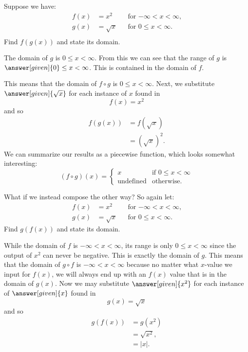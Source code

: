 \documentclass{ximera}
\begin{document}
\begin{example}
 Suppose we have:
\begin{align*}
  f(x)&=x^2 &&\text{for $-\infty< x< \infty$,}\\
  g(x)&= \sqrt{x} &&\text{for $0\le x< \infty$.}\\
\end{align*}
Find $f(g(x))$ and state its domain.
\begin{explanation}
  The domain of $g$ is $0\le x< \infty$. From this we can see that the
  range of $g$ is $\answer[given]{0}\le x< \infty$. This is contained
  in the domain of $f$.

  This means that the domain of $f\circ g$ is $0\le x< \infty$.  Next,
  we substitute $\answer[given]{\sqrt{x}}$ for each instance of $x$
  found in
  \[
  f(x)={{x}^{2}}
  \]
  and so
  \begin{align*}
  f(g(x))&=f(\sqrt{x})\\
  &=\left(\sqrt{x}\right)^2.
  \end{align*}
  We can summarize our results as a piecewise function, which
  looks somewhat interesting:
  \[
  (f\circ g)(x) = 
  \begin{cases}
    x & \text{if $0\le x < \infty$}\\
   \text{undefined} &\text{otherwise}. 
  \end{cases}
  \]
\end{explanation}
\end{example}


\begin{example}
 What if we instead compose the other way? So again let:
\begin{align*}
  f(x)&=x^2 &&\text{for $-\infty< x< \infty$,}\\
  g(x)&= \sqrt{x} &&\text{for $0\le x< \infty$.}
\end{align*}
Find $g(f(x))$ and state its domain.
\begin{explanation}
  While the domain of $f$ is $-\infty< x< \infty$, its range is only
  $0 \le x<\infty$ since the output of $x^2$ can never be negative. This is exactly the domain of $g$. This means that
  the domain of $g\circ f$ is $-\infty< x< \infty$ because no matter what $x$-value we input for $f(x)$, we will always end up with an $f(x)$ value that is in the domain of $g(x)$.
  Now we may substitute $\answer[given]{x^2}$ for each instance of
  $\answer[given]{x}$ found in
  \[
  g(x)=\sqrt{x}
  \]
  and so
  \begin{align*}
  g(f(x))&=g(x^2)\\
  &=\sqrt{x^2},\\
  &=|x|.
  \end{align*}
\end{explanation}
\end{example}
\end{document}
